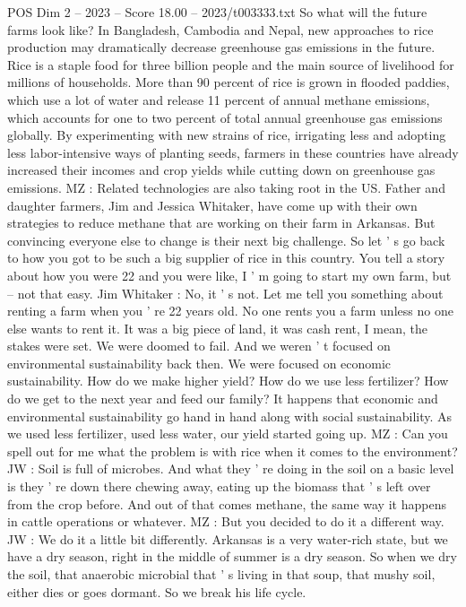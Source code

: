 \begin{textsample}{POS Dim 2 – 2023 – Score 18.00 – 2023/t003333.txt}
So what will the future farms look like?
In Bangladesh, Cambodia and Nepal, new approaches to rice production may dramatically decrease greenhouse gas emissions in the future.
Rice is a staple food for three billion people and the main source of livelihood for millions of households.
More than 90 percent of rice is grown in flooded paddies, which use a lot of water and release 11 percent of annual methane emissions, which accounts for one to two percent of total annual greenhouse gas emissions globally.
By experimenting with new strains of rice, irrigating less and adopting less labor-intensive ways of planting seeds, farmers in these countries have already increased their incomes and crop yields while cutting down on greenhouse gas emissions.
MZ : Related technologies are also taking root in the US.
Father and daughter farmers, Jim and Jessica Whitaker, have come up with their own strategies to reduce methane that are working on their farm in Arkansas.
But convincing everyone else to change is their next big challenge.
So let ' s go back to how you got to be such a big supplier of rice in this country.
You tell a story about how you were 22 and you were like, I ' m going to start my own farm, but -- not that easy.
Jim Whitaker : No, it ' s not.
Let me tell you something about renting a farm when you ' re 22 years old.
No one rents you a farm unless no one else wants to rent it.
It was a big piece of land, it was cash rent, I mean, the stakes were set.
We were doomed to fail.
And we weren ' t focused on environmental sustainability back then.
We were focused on economic sustainability.
How do we make higher yield?
How do we use less fertilizer?
How do we get to the next year and feed our family?
It happens that economic and environmental sustainability go hand in hand along with social sustainability.
As we used less fertilizer, used less water, our yield started going up.
MZ : Can you spell out for me what the problem is with rice when it comes to the environment?
JW : Soil is full of microbes.
And what they ' re doing in the soil on a basic level is they ' re down there chewing away, eating up the biomass that ' s left over from the crop before.
And out of that comes methane, the same way it happens in cattle operations or whatever.
MZ : But you decided to do it a different way.
JW : We do it a little bit differently.
Arkansas is a very water-rich state, but we have a dry season, right in the middle of summer is a dry season.
So when we dry the soil, that anaerobic microbial that ' s living in that soup, that mushy soil, either dies or goes dormant.
So we break his life cycle.

\end{textsample}
